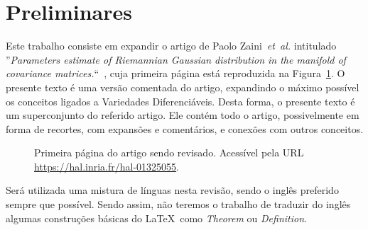 \documentclass[a4paper,titlepage]{article}
\begin{document}


\section{Preliminares}

Este trabalho consiste em expandir o artigo de Paolo Zaini~\textit{et~al.}
intitulado ''\textit{Parameters estimate of Riemannian Gaussian distribution in
the manifold of covariance matrices.}``~\cite{zanini:hal-01325055},
cuja primeira página está reproduzida na Figura~\ref{fig:paper:page1}.
O presente texto é uma versão comentada do artigo,
expandindo o máximo possível os conceitos ligados a Variedades Diferenciáveis.
Desta forma, o presente texto é um superconjunto do referido artigo.
Ele contém todo o artigo, possivelmente em forma de recortes, com expansões e
comentários, e conexões com outros conceitos.

\begin{figure}
\centering
{}
\caption{%
Primeira página do artigo sendo revisado. Acessível pela URL
\url{https://hal.inria.fr/hal-01325055}.
}\label{fig:paper:page1}
\end{figure}

Será utilizada uma mistura de línguas nesta revisão, sendo o inglês preferido
sempre que possível. Sendo assim, não teremos o trabalho de traduzir do inglês
algumas construções básicas do \LaTeX\ como \emph{Theorem} ou
\emph{Definition}.
\end{document}
